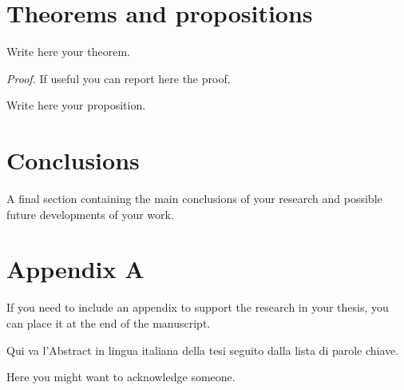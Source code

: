 \documentclass[university=polimi, master, format=article, language=english]{academicthesis}
\begin{document}
\section{Theorems and propositions}
\begin{theorem}
  Write here your theorem.
\end{theorem}
\textit{Proof.} If useful you can report here the proof.

\begin{proposition}
  Write here your proposition.
\end{proposition}

\section{Conclusions}
A final section containing the main conclusions of your research and
possible future developments of your work.


\appendix
\section{Appendix A}
If you need to include an appendix to support the research in your
thesis, you can place it at the end of the manuscript.

\clearpage

\begin{abstractthesis}[language=italian,
                       keywords={qui, le parole chiave, della tesi, in italiano}]
  Qui va l'Abstract in lingua italiana della tesi seguito dalla lista di
  parole chiave.
\end{abstractthesis}

\begin{acknowledgements}
  Here you might want to acknowledge someone.
\end{acknowledgements}
\end{document}
